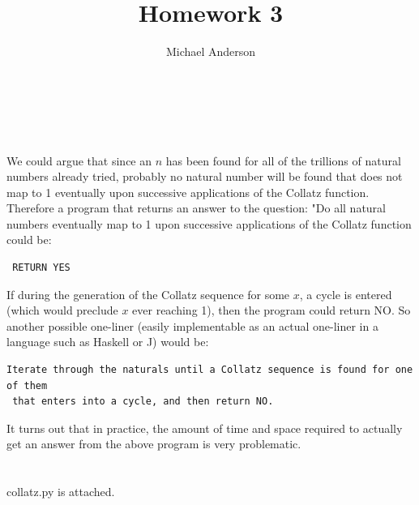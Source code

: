 \documentclass{article}
\author{Michael Anderson}
\title{Homework 3}
\begin{document}
\maketitle
{}
\\
\flushleft
\newpage

\section{}
We could argue that since an $n$ has been found for all of the trillions of
natural numbers already tried, probably no natural number will be found that
does not map to 1 eventually upon successive applications of the Collatz
function. Therefore a program that returns an answer to the question: "Do all
natural numbers eventually map to 1 upon successive applications of the
Collatz function could be:

\begin{verbatim} RETURN YES \end{verbatim}

If during the generation of the Collatz sequence for some $x$, a cycle is
entered (which would preclude $x$ ever reaching 1),
then the program could return NO. So
another possible one-liner (easily implementable as an actual one-liner in a
language such as Haskell or J) would be:

\begin{verbatim}
Iterate through the naturals until a Collatz sequence is found for one of them
 that enters into a cycle, and then return NO.
\end{verbatim}

It turns out that in practice, the amount of time and space required to
actually get an answer from the above program is very problematic.

\section{}
collatz.py is attached.
\end{document}
